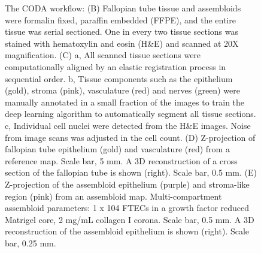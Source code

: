 \begin{refsection}
    \begin{figure}[h!]
        \ContinuedFloat
        \captionsetup{font=small}
        \caption[]{The CODA workflow: (B) Fallopian tube tissue and assembloids were formalin fixed, paraffin embedded (FFPE),  and the entire tissue was serial sectioned. One in every two tissue sections was stained with hematoxylin and eosin (H&E) and scanned at 20X magnification. (C) a, All scanned tissue sections were computationally aligned by an elastic registration process in sequential order. b, Tissue components such as the epithelium (gold), stroma (pink), vasculature (red) and nerves (green) were manually annotated in a small fraction of the images to train the deep learning algorithm to automatically segment all tissue sections. c, Individual cell nuclei were detected from the H&E images. Noise from image scans was adjusted in the cell count. (D) Z-projection of fallopian tube epithelium (gold) and vasculature (red) from a reference map. Scale bar, 5 mm. A 3D reconstruction of a cross section of the fallopian tube is shown (right). Scale bar, 0.5 mm. (E) Z-projection of the assembloid epithelium (purple) and stroma-like region (pink) from an assembloid map. Multi-compartment assembloid parameters: 1 x 104 FTECs in a growth factor reduced Matrigel core, 2 mg/mL collagen I corona. Scale bar, 0.5 mm. A 3D reconstruction of the assembloid epithelium is shown (right). Scale bar, 0.25 mm.}
    \end{figure}


\end{refsection}
